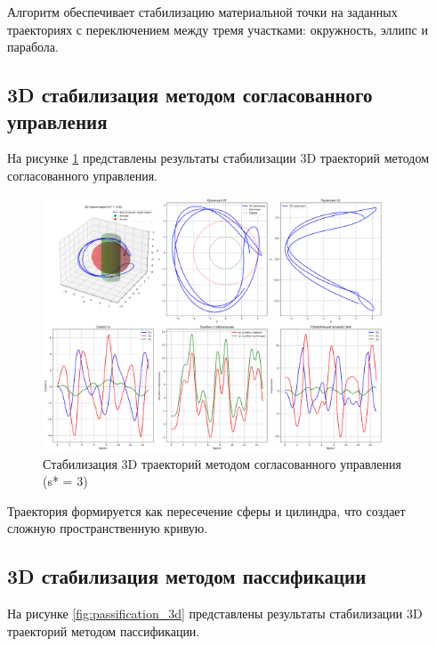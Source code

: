 Алгоритм обеспечивает стабилизацию материальной точки на заданных траекториях с переключением между тремя участками: окружность, эллипс и парабола.

\subsection{3D стабилизация методом согласованного управления}

На рисунке \ref{fig:coordinated_3d} представлены результаты стабилизации 3D траекторий методом согласованного управления.

\begin{figure}[H]
\centering
\includegraphics[width=0.9\textwidth]{images/task2/coordinated_control_3d_s3.0.png}
\caption{Стабилизация 3D траекторий методом согласованного управления (s* = 3)}
\label{fig:coordinated_3d}
\end{figure}

Траектория формируется как пересечение сферы и цилиндра, что создает сложную пространственную кривую.

\subsection{3D стабилизация методом пассификации}

На рисунке \ref{fig:passification_3d} представлены результаты стабилизации 3D траекторий методом пассификации.

